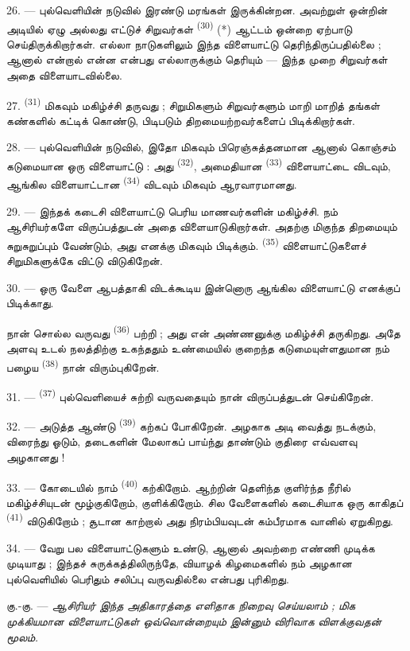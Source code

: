 26. --- புல்வெளியின் நடுவில் இரண்டு மரங்கள் இருக்கின்றன. அவற்றுள் ஒன்றின்
அடியில் ஏழு அல்லது எட்டுச் சிறுவர்கள் 
\textsuperscript{(30)} (*) ஆட்டம் ஒன்றை ஏற்பாடு செய்திருக்கிறார்கள். எல்லா
நாடுகளிலும் இந்த விளையாட்டு தெரிந்திருப்பதில்லை ; ஆனால்  என்றால் என்ன என்பது எல்லாருக்கும் தெரியும் — இந்த முறை
சிறுவர்கள் அதை விளையாடவில்லை.

\VUsaut{5.0mm}
\VUsaut{3.4mm}

27. \textsuperscript{(31)} மிகவும் மகிழ்ச்சி
தருவது ; சிறுமிகளும் சிறுவர்களும் மாறி மாறித் தங்கள் கண்களில்
 கட்டிக் கொண்டு, பிடிபடும் திறமையற்றவர்களைப்
பிடிக்கிறார்கள்.

28. --- புல்வெளியின் நடுவில், இதோ மிகவும் பிரெஞ்சுத்தனமான ஆனால் கொஞ்சம்
கடுமையான ஒரு விளையாட்டு : அது \textsuperscript{(32)},
அமைதியான \textsuperscript{(33)} விளையாட்டை விடவும், ஆங்கில
விளையாட்டான \textsuperscript{(34)} விடவும் மிகவும்
ஆரவாரமானது.

29. --- இந்தக் கடைசி விளையாட்டு பெரிய மாணவர்களின் மகிழ்ச்சி. நம் ஆசிரியர்களே
விருப்பத்துடன் அதை விளையாடுகிறார்கள். அதற்கு மிகுந்த திறமையும் சுறுசுறுப்பும்
வேண்டும், அது எனக்கு மிகவும் பிடிக்கும். \textsuperscript{(35)}
விளையாட்டுகளைச் சிறுமிகளுக்கே விட்டு விடுகிறேன்.

30. --- ஒரு வேளை ஆபத்தாகி விடக்கூடிய இன்னொரு ஆங்கில விளையாட்டு எனக்குப்
பிடிக்காது.

நான் சொல்ல வருவது \textsuperscript{(36)} பற்றி ; அது
என் அண்ணனுக்கு மகிழ்ச்சி தருகிறது. அதே அளவு உடல் நலத்திற்கு உகந்ததும்
உண்மையில் குறைந்த கடுமையுள்ளதுமான நம் பழைய 
\textsuperscript{(38)} நான் விரும்புகிறேன்.

\VUsaut{4.6mm}
\VUsaut{3.0mm}

31. --- \textsuperscript{(37)} புல்வெளியைச் சுற்றி
வருவதையும் நான் விருப்பத்துடன் செய்கிறேன்.

32. --- அடுத்த ஆண்டு \textsuperscript{(39)} கற்கப்
போகிறேன். அழகாக அடி வைத்து நடக்கும், விரைந்து ஓடும், தடைகளின் மேலாகப்
பாய்ந்து தாண்டும் குதிரை எவ்வளவு அழகானது !

33. --- கோடையில் நாம் \textsuperscript{(40)} கற்கிறோம்.
ஆற்றின் தெளிந்த குளிர்ந்த நீரில் மகிழ்ச்சியுடன் மூழ்குகிறோம், குளிக்கிறோம்.
சில வேளைகளில் கடைசியாக ஒரு காகிதப் \textsuperscript{(41)}
விடுகிறோம் ; சூடான காற்றால் அது நிரம்பியவுடன் கம்பீரமாக வானில் ஏறுகிறது.

34. --- வேறு பல விளையாட்டுகளும் உண்டு, ஆனால் அவற்றை எண்ணி முடிக்க
முடியாது ; இந்தச் சுருக்கத்திலிருந்தே, வியாழக் கிழமைகளில் நம் அழகான
புல்வெளியில் பெரிதும் சலிப்பு வருவதில்லை என்பது புரிகிறது.

கு.-கு. --- \textit{ஆசிரியர் இந்த அதிகாரத்தை எளிதாக நிறைவு செய்யலாம் ;}
\textit{மிக முக்கியமான விளையாட்டுகள் ஒவ்வொன்றையும் இன்னும் விரிவாக}
\textit{விளக்குவதன் மூலம்.}
